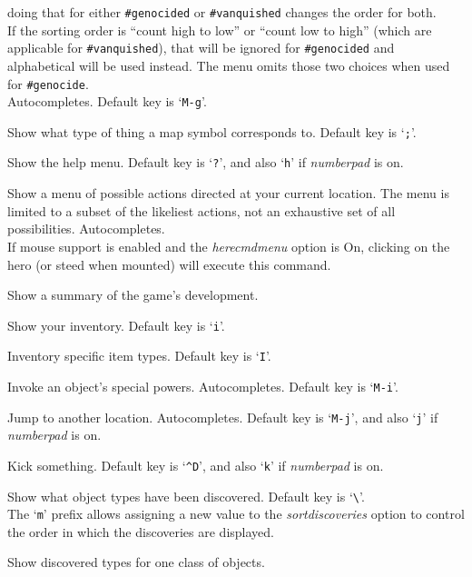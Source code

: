 \documentclass[titlepage]{article}
\begin{document}
\begin{description}[font=\mdseries\ttfamily]
doing that for either \texttt{\#genocided} or \texttt{\#vanquished} changes the order for both.
\\
If the sorting order is ``count high to low'' or ``count low to high''
(which are applicable for \texttt{\#vanquished}), that will be ignored
for \texttt{\#genocided} and alphabetical will be used instead.
The menu omits those two choices when used for \texttt{\#genocide}.
\\
Autocompletes.
Default key is `\texttt{M-g}'.
\item[\#glance]
Show what type of thing a map symbol corresponds to. Default key is `\texttt{;}'.
\item[\#help]
Show the help menu.
Default key is `\texttt{?}',
and also `\texttt{h}' if \textit{number\textunderscore pad} is on.
\item[\#herecmdmenu]
Show a menu of possible actions directed at your current location.
The menu is limited to a subset of the likeliest actions, not an
exhaustive set of all possibilities.
Autocompletes.\\
If mouse support is enabled and the \textit{herecmd\textunderscore menu}
option is On, clicking on the hero (or steed when mounted) will
execute this command.
\item[\#history]
Show a summary of the game's development.
\item[\#inventory]
Show your inventory. Default key is `\texttt{i}'.
\item[\#inventtype]
Inventory specific item types. Default key is `\texttt{I}'.
\item[\#invoke]
Invoke an object's special powers. Autocompletes. Default key is `\texttt{M-i}'.
\item[\#jump]
Jump to another location. Autocompletes.
Default key is `\texttt{M-j}',
and also `\texttt{j}' if \textit{number\textunderscore pad} is on.
\item[\#kick]
Kick something.
Default key is `\texttt{\textasciicircum D}',
and also `\texttt{k}' if \textit{number\textunderscore pad} is on.
\item[\#known]
Show what object types have been discovered.
Default key is `\texttt{\textbackslash}'.
\\
The `\texttt{m}' prefix allows assigning a new value to the
\textit{sortdiscoveries}
option to control the order in which the discoveries are displayed.
\item[\#knownclass]
Show discovered types for one class of objects.

\end{description}
\end{document}
